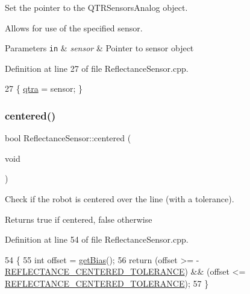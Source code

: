 Set the pointer to the Q\+T\+R\+Sensors\+Analog object. 

Allows for use of the specified sensor. 
\begin{DoxyParams}[1]{Parameters}
\mbox{\tt in}  & {\em sensor} & Pointer to sensor object \\
\hline
\end{DoxyParams}


Definition at line 27 of file Reflectance\+Sensor.\+cpp.


\begin{DoxyCode}
27 \{ \hyperlink{class_reflectance_sensor_a1eb0a090b619705b0234cea224400829}{qtra} = sensor; \}
\end{DoxyCode}
\mbox{\label{class_reflectance_sensor_af24236e10ded862847bb6a626c5cf336}} 
\subsubsection{\texorpdfstring{centered()}{centered()}}
{\footnotesize\ttfamily bool Reflectance\+Sensor\+::centered (\begin{DoxyParamCaption}\item[{void}]{ }\end{DoxyParamCaption})}



Check if the robot is centered over the line (with a tolerance). 

\begin{DoxyReturn}{Returns}
true if centered, false otherwise 
\end{DoxyReturn}


Definition at line 54 of file Reflectance\+Sensor.\+cpp.


\begin{DoxyCode}
54                                      \{
55     \textcolor{keywordtype}{int} offset = \hyperlink{class_reflectance_sensor_a1e361d2a9a18b4c9da19bdc4b061a3c7}{getBias}();
56     \textcolor{keywordflow}{return} (offset >= -\hyperlink{config_8h_a3c9f857ec5d932611594dc0cfb366bf5}{REFLECTANCE\_CENTERED\_TOLERANCE}) && (offset <= 
      \hyperlink{config_8h_a3c9f857ec5d932611594dc0cfb366bf5}{REFLECTANCE\_CENTERED\_TOLERANCE});
57 \}
\end{DoxyCode}
\mbox{\label{class_reflectance_sensor_a1e361d2a9a18b4c9da19bdc4b061a3c7}} 
